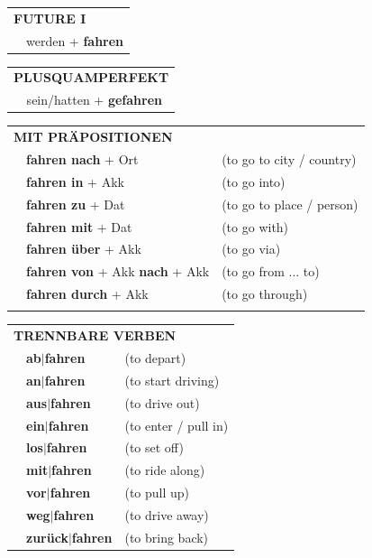 \documentclass[10pt,a4paper]{revtex4-2}
\begin{document}
\begin{verbbox-acc}
\begin{tabular}{rl}
    \multicolumn{2}{l}{\textbf{FUTURE I} }\\
  &  werden + \textbf{fahren}\\
 
  \end{tabular}
\hfill
   \begin{tabular}{rl}
      \multicolumn{2}{l}{\textbf{PLUSQUAMPERFEKT}}\\
   & sein/hatten + \textbf{gefahren}\\
  \end{tabular}
  
\vspace{10pt}

   \begin{tabular}{lll}
      \multicolumn{3}{l}{\textbf{MIT PRÄPOSITIONEN}}\\
& \textbf{fahren nach} + Ort & (to go to city / country)\\
&\textbf{fahren in} + Akk & (to go into)\\
&\textbf{fahren zu} + Dat & (to go to place / person)\\
&\textbf{fahren mit} + Dat & (to go with)\\
&\textbf{fahren über} + Akk & (to go via)\\
&\textbf{fahren von} + Akk  \textbf{nach} + Akk & (to go from ... to)\\
&\textbf{fahren durch} + Akk & (to go through)\\
\vspace{20pt}
  \end{tabular}
  \hfill
   \begin{tabular}{lll}
      \multicolumn{3}{l}{\textbf{TRENNBARE VERBEN}}\\
 & \textbf{ab$|$fahren} & (to depart)\\
 & \textbf{an$|$fahren} & (to start driving)\\
  & \textbf{aus$|$fahren} & (to drive out)\\
  & \textbf{ein$|$fahren} & (to enter / pull in)\\
  & \textbf{los$|$fahren} & (to set off)\\
     & \textbf{mit$|$fahren} & (to ride along)\\
     & \textbf{vor$|$fahren} & (to pull up)\\
     & \textbf{weg$|$fahren} & (to drive away)\\
      & \textbf{zurück$|$fahren} & (to bring back)\\
  \end{tabular}


  \vspace{-5pt}

\end{verbbox-acc}
\end{document}
